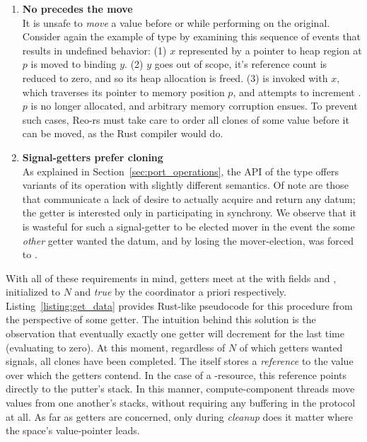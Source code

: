 \begin{enumerate}
	\item \textbf{No  precedes the move}\\
	 It is unsafe to \textit{move} a value before or while performing  on the original. Consider again the example of type  by examining this sequence of events that results in undefined behavior: (1)  $x$ represented by a pointer to heap region at $p$ is moved to binding $y$. (2) $y$ goes out of scope, it's reference count is reduced to zero, and so its heap allocation is freed. (3)  is invoked with $x$, which traverses its pointer to memory position $p$, and attempts to increment . $p$ is no longer allocated, and arbitrary memory corruption ensues. To prevent such cases, Reo-rs must take care to order all clones of some value before it can be moved, as the Rust compiler would do.
	 
	 \item \textbf{Signal-getters prefer cloning}\\
	 As explained in Section~\ref{sec:port_operations}, the API of the  type offers variants of its  operation with slightly different semantics. Of note are those that communicate a lack of desire to actually acquire and return any datum; the getter is interested only in participating in synchrony. We observe that it is wasteful for such a signal-getter to be elected mover in the event the some \textit{other} getter wanted the datum, and by losing the mover-election, was forced to .
\end{enumerate}

With all of these requirements in mind, getters meet at the  with fields  and , initialized to $N$ and \textit{true} by the coordinator a priori respectively. Listing~\ref{listing:get_data} provides Rust-like pseudocode for this procedure from the perspective of some getter. The intuition behind this solution is the observation that eventually exactly one getter will decrement  for the last time (evaluating  to zero). At this moment, regardless of $N$ of which getters wanted signals, all clones have been completed. The  itself stores a \textit{reference} to the value over which the getters contend. In the case of a -resource, this reference points directly to the putter's stack. In this manner, compute-component threads move values from one another's stacks, without requiring any buffering in the protocol at all. As far as getters are concerned, only during \textit{cleanup} does it matter where the space's value-pointer leads.

